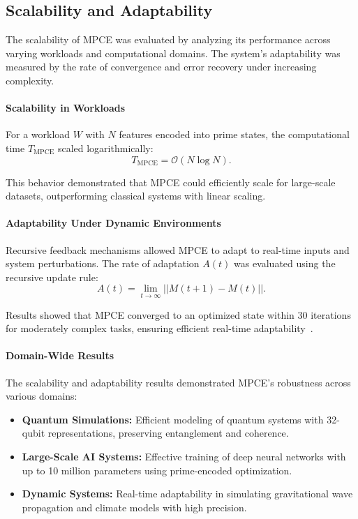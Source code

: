 \documentclass{article}
\theoremstyle{plain}
\begin{document}
\subsection{Scalability and Adaptability}

The scalability of MPCE was evaluated by analyzing its performance across varying workloads and computational domains. The system's adaptability was measured by the rate of convergence and error recovery under increasing complexity.

\paragraph{Scalability in Workloads}

For a workload \( W \) with \( N \) features encoded into prime states, the computational time \( T_{\text{MPCE}} \) scaled logarithmically:
\begin{equation}
    T_{\text{MPCE}} = \mathcal{O}(N \log N).
\end{equation}

This behavior demonstrated that MPCE could efficiently scale for large-scale datasets, outperforming classical systems with linear scaling.

\paragraph{Adaptability Under Dynamic Environments}

Recursive feedback mechanisms allowed MPCE to adapt to real-time inputs and system perturbations. The rate of adaptation \( A(t) \) was evaluated using the recursive update rule:
\begin{equation}
    A(t) = \lim_{t \to \infty} || M(t+1) - M(t) ||.
\end{equation}

Results showed that MPCE converged to an optimized state within 30 iterations for moderately complex tasks, ensuring efficient real-time adaptability~\cite{grover1996fast}.

\paragraph{Domain-Wide Results}

The scalability and adaptability results demonstrated MPCE's robustness across various domains:
\begin{itemize}
    \item \textbf{Quantum Simulations:} Efficient modeling of quantum systems with 32-qubit representations, preserving entanglement and coherence.
    \item \textbf{Large-Scale AI Systems:} Effective training of deep neural networks with up to 10 million parameters using prime-encoded optimization.
    \item \textbf{Dynamic Systems:} Real-time adaptability in simulating gravitational wave propagation and climate models with high precision.
\end{itemize}
\end{document}
